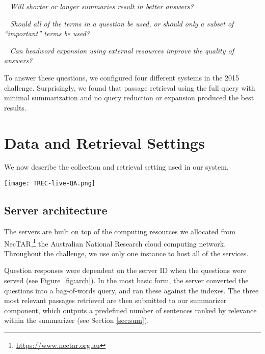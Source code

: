 \documentclass[a4paper,10pt,conference,compsocconf,final]{IEEEtran}
\newcommand{\myparagraph}[1]{\vspace*{1ex}\noindent{\textbf{#1.}}~}
\newcommand{\ko}[1]{\textrm{\textcolor{red}{Kevin says: #1\\}}}
\begin{document}
\myparagraph{RQ 1:}
{\emph{
Will shorter or longer summaries result in better answers?
}}

\myparagraph{RQ 2:}
{\emph{
Should all of the terms in a question be used, or should only a 
subset of ``important'' terms be used?
}}

\myparagraph{RQ 3:}
{\emph{
Can headword expansion using external resources improve the
quality of answers?
}}

\bigskip

To answer these questions, we configured four different systems 
in the 2015 challenge.
Surprisingly, we found that passage retrieval using the full query
with minimal summarization and no query reduction or expansion
produced the best results.

\section{Data and Retrieval Settings}
We now describe the collection and retrieval setting used in our
system. 

\begin{figure*}
  \centering
  \texttt{[image: TREC-live-QA.png]}
  \label{fig:arch}
  \caption{System architecture for each RMIT system.
  Green shading indicates components that are different when compared
  to RMIT-0.}
  \end{figure*}

\subsection{Server architecture}

The servers are built on top of the computing resources we allocated
from NecTAR,\footnote{\url{https://www.nectar.org.au}} the Australian
National Research cloud computing network.
Throughout the challenge, we use only one instance to host all of the
services.

Question responses were dependent on the server ID when the questions
were served (see Figure~\ref{fig:arch}).
In the most basic form, the server converted the questions into a bag-of-words
query, and ran these against the indexes.
The three most relevant passages retrieved are then submitted to our 
summarizer component, which outputs a predefined number of sentences ranked by
relevance within the summarizer (see Section \ref{sec:sum}).
\end{document}
